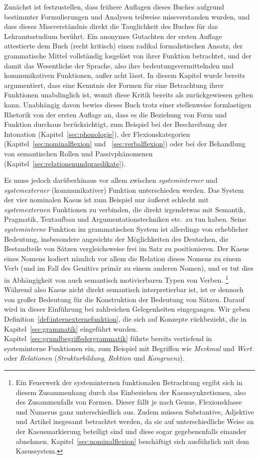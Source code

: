 Zunächst ist festzustellen, dass frühere Auflagen dieses Buches aufgrund bestimmter Formulierungen und Analysen teilweise missverstanden wurden, und dass dieses Missverständnis direkt die Tauglichkeit des Buches für das Lehramtsstudium berührt.
Ein anonymes Gutachten der ersten Auflage attestierte dem Buch (recht kritisch) einen radikal formalistischen Ansatz, der grammatische Mittel vollständig losgelöst von ihrer Funktion betrachtet, und der damit das Wesentliche der Sprache, also ihre bedeutungsvermittelnden und kommunikativen Funktionen, außer acht lässt.
In diesem Kapitel wurde bereits argumentiert, dass eine Kenntnis der Formen für eine Betrachtung ihrer Funktionen unabdinglich ist, womit diese Kritik bereits als zurückgewiesen gelten kann.
Unabhängig davon bewies dieses Buch trotz einer stellenweise formlastigen Rhetorik von der ersten Auflage an, dass es die Beziehung von Form und Funktion durchaus berücksichtigt, zum Beispiel bei der Beschreibung der Intonation (Kapitel~\ref{sec:phonologie}), der Flexionskategorien (Kapitel~\ref{sec:nominalflexion} und ~\ref{sec:verbalflexion}) oder bei der Behandlung von semantischen Rollen und Passivphänomenen (Kapitel~\ref{sec:relationenundpraedikate}).

Es muss jedoch darüberhinaus vor allem zwischen \textit{systeminterner} und \textit{systemexterner} (\zB kommunikativer) Funktion unterschieden werden.
Das System der vier nominalen Kasus ist zum Beispiel nur äußerst schlecht mit \textit{systemexternen} Funktionen zu verbinden, die direkt irgendetwas mit Semantik, Pragmatik, Textaufbau und Argumentationstechniken etc.\ zu tun haben.
Seine \textit{systeminterne} Funktion im grammatischen System ist allerdings von erheblicher Bedeutung, insbesondere angesichts der Möglichkeiten des Deutschen, die Bestandteile von Sätzen vergleichsweise frei im Satz zu positionieren.
Der Kasus eines Nomens kodiert nämlich vor allem die Relation dieses Nomens zu einem Verb (und im Fall des Genitivs primär zu einem anderen Nomen), und er tut dies in Abhängigkeit von auch semantisch motivierbaren Typen von Verben.%
\footnote{Ein Feuerwerk der systeminternen funktionalen Betrachtung ergibt sich in diesem Zusammenhang durch das Einbeziehen der Kasussynkretismen, also des Zusammenfalls von Formen.
Dieser fällt je nach Genus, Flexionsklasse und Numerus ganz unterschiedlich aus.
Zudem müssen Substantive, Adjektive und Artikel insgesamt betrachtet werden, da sie auf unterschiedliche Weise an der Kasusmarkierung beteiligt sind und diese sogar gegebenenfalls einander abnehmen.
Kapitel~\ref{sec:nominalflexion} beschäftigt sich ausführlich mit dem Kasussystem.}
Während also Kasus nicht direkt semantisch interpretierbar ist, ist er dennoch von großer Bedeutung für die Konstruktion der Bedeutung von Sätzen.
Darauf wird in dieser Einführung bei zahlreichen Gelegenheiten eingegangen.
Wir geben Definition~\ref{def:internexternefunktion}, die sich auf Konzepte rückbezieht, die in Kapitel~\ref{sec:grammatik} eingeführt wurden.
Kapitel~\ref{sec:grundbegriffedergrammatik} führte bereits vertiefend in systeminterne Funktionen ein, zum Beispiel mit Begriffen wie \textit{Merkmal} und \textit{Wert} oder \textit{Relationen} (\textit{Strukturbildung}, \textit{Rektion} und \textit{Kongruenz}).

